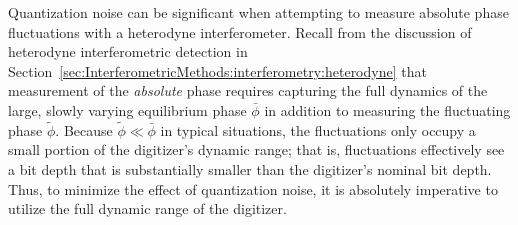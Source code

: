 Quantization noise can be significant
when attempting to measure absolute phase fluctuations
with a heterodyne interferometer.
Recall from the discussion of heterodyne interferometric detection in
Section~\ref{sec:InterferometricMethods:interferometry:heterodyne}
that measurement of the \emph{absolute} phase
requires capturing the full dynamics
of the large, slowly varying equilibrium phase $\bar{\phi}$
in addition to measuring the fluctuating phase $\tilde{\phi}$.
Because $\tilde{\phi} \ll \bar{\phi}$ in typical situations,
the fluctuations only occupy a small portion
of the digitizer's dynamic range; that is,
fluctuations effectively see a bit depth that
is substantially smaller than the digitizer's nominal bit depth.
Thus, to minimize the effect of quantization noise,
it is absolutely imperative
to utilize the full dynamic range of the digitizer.

